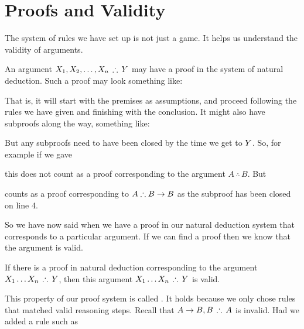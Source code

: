 \section{Proofs and Validity}
The system of rules we have set up is not just a game. It helps us understand the validity of arguments.

An argument
$\metaX_1, \metaX_2, \ldots, \metaX_n\,\therefore\, \metaY$
may have a proof in the system of natural deduction. Such a proof may look something like:
\begin{fitchproof}
	\ellipsesline
\end{fitchproof}
That is, it will start with the premises as assumptions, and proceed following the rules we have given and finishing with the conclusion.
It might also have subproofs along the way, something like:
\begin{fitchproof}
	\ellipsesline
	\open
		\ellipsesline
		\open
		\ellipsesline
		\close
		\ellipsesline
	\close
	\ellipsesline
\end{fitchproof}
But any subproofs need to have been closed by the time we get to $Y$.
So, for example if we gave
\begin{fitchproof}
	\open
		\close
\end{fitchproof}
this does not count as a proof corresponding to the argument $A\,\therefore\,B$.
But \begin{fitchproof}
	\open
		\close
\end{fitchproof}
counts as a proof corresponding to $A\therefore B\eif B$ as the subproof has been closed on line 4.

So we have now said when we have a proof in our natural deduction system that corresponds to a particular argument. If we can find a proof then we know that the argument is valid.
\begin{highlighted}
If there is a proof in natural deduction corresponding to the argument $\metaX_1\ldots\metaX_n\,\therefore\,\metaY$, then this argument $\metaX_1\ldots\metaX_n\,\therefore\,\metaY$ is valid.
\end{highlighted}
This property of our proof system is called . It holds because we only chose rules that matched valid reasoning steps.
Recall that $A\eif B, B\,\therefore\, A$ is invalid. Had we added a rule such as
	\begin{fitchproof}
	\ellipsesline
	\ellipsesline
	\ellipsesline
	\end{fitchproof}

